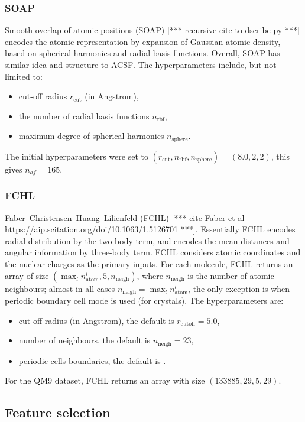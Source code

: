 \documentclass[12pt]{article}
\def\att{                    %
        \marginpar[ \hspace*{\fill} \raisebox{-0.2em}{\rule{2mm}{1.2em}} ]
        {\raisebox{-0.2em}{\rule{2mm}{1.2em}} }
        }
\def\at#1{[*** \att #1 ***]}  %
\begin{document}
\subsubsection{SOAP}
Smooth overlap of atomic positions (SOAP) \at{recursive cite to dscribe py} encodes the atomic representation by expansion of Gaussian atomic density, based on spherical harmonics and radial basis functions.
Overall, SOAP has similar idea and structure to ACSF. The hyperparameters include, but not limited to:
\begin{itemize}
	\item cut-off radius $r_\text{cut}$ (in Angstrom),
	\item the number of radial basis functions $n_\text{rbf}$,
	\item maximum degree of spherical harmonics $n_\text{sphere}$.
\end{itemize} 
The initial hyperparameters were set to $(r_\text{cut}, n_\text{rbf}, n_\text{sphere}) = (8.0, 2, 2)$, this gives $n_{af} = 165$.

\subsubsection{FCHL}
Faber--Christensen--Huang--Lilienfeld (FCHL) \at{cite Faber et al \url{https://aip.scitation.org/doi/10.1063/1.5126701}}. Essentially FCHL encodes radial distribution by the two-body term, and encodes the mean distances and angular information by three-body term. FCHL considers atomic coordinates and the nuclear charges as the primary inputs. For each molecule, FCHL returns an array of size $(\max_l n^l_\text{atom}, 5, n_\text{neigh})$, where $n_\text{neigh}$ is the number of atomic neighbours; almost in all cases $n_\text{neigh} = \max_l n^l_\text{atom}$, the only exception is when periodic boundary cell mode is used (for crystals). The hyperparameters are: 
\begin{itemize}
	\item cut-off radius (in Angstrom), the default is $r_\text{cutoff} = 5.0$,
	\item number of neighbours, the default is $n_\text{neigh} = 23$,
	\item periodic cells boundaries, the default is .
\end{itemize}
For the QM9 dataset, FCHL returns an array with size $(133885, 29, 5, 29)$.

\subsection{Feature selection}
\label{sec:feature}
\end{document}
